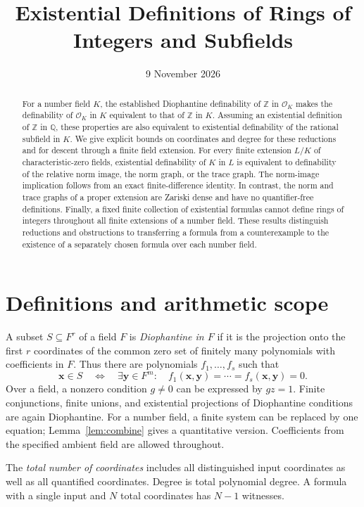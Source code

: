\documentclass[11pt,a4paper]{article}
\title{Existential Definitions of Rings of Integers and Subfields}
\author{}
\date{9 November 2026}
\theoremstyle{definition}
\newcommand{\Q}{\mathbb Q}
\newcommand{\Z}{\mathbb Z}
\begin{document}
\maketitle
\begin{abstract}
For a number field $K$, the established Diophantine definability of
$\Z$ in $\mathcal O_K$ makes the definability of $\mathcal O_K$ in
$K$ equivalent to that of $\Z$ in $K$. Assuming an existential
definition of $\Z$ in $\Q$, these properties are also equivalent to
existential definability of the rational subfield in $K$.
We give explicit bounds on coordinates and degree for these
reductions and for descent through a finite field extension.
For every finite extension $L/K$ of characteristic-zero fields,
existential definability of $K$ in $L$ is equivalent to definability
of the relative norm image, the norm graph, or the trace graph.
The norm-image implication follows from an exact finite-difference
identity. In contrast, the norm and trace graphs of a proper
extension are Zariski dense and have no quantifier-free definitions.
Finally, a fixed finite collection of existential formulas cannot
define rings of integers throughout all finite extensions of a
number field. These results distinguish reductions and obstructions
to transferring a formula from a counterexample to the existence of
a separately chosen formula over each number field.
\end{abstract}

\section{Definitions and arithmetic scope}

A subset $S\subseteq F^r$ of a field $F$ is \emph{Diophantine in $F$}
if it is the projection onto the first $r$ coordinates of the common
zero set of finitely many polynomials with coefficients in $F$.
Thus there are polynomials $f_1,\ldots,f_s$ such that
\[
 \mathbf x\in S\quad\Longleftrightarrow\quad
 \exists\mathbf y\in F^m:\quad
 f_1(\mathbf x,\mathbf y)=\cdots=f_s(\mathbf x,\mathbf y)=0.
\]
Over a field, a nonzero condition $g\ne0$ can be expressed by
$gz=1$. Finite conjunctions, finite unions, and existential
projections of Diophantine conditions are again Diophantine.
For a number field, a finite system can be replaced by one equation;
Lemma~\ref{lem:combine} gives a quantitative version. Coefficients
from the specified ambient field are allowed throughout.

The \emph{total number of coordinates} includes all distinguished
input coordinates as well as all quantified coordinates. Degree is
total polynomial degree. A formula with a single input and $N$
total coordinates has $N-1$ witnesses.
\end{document}
